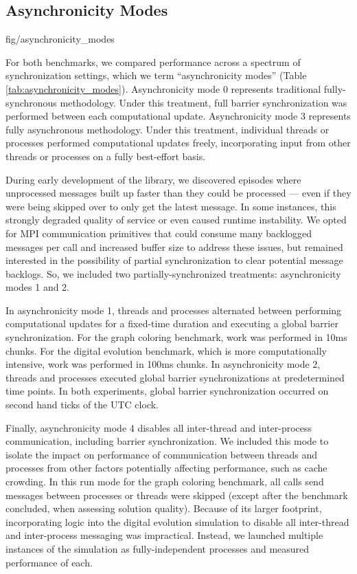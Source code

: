 \subsection{Asynchronicity Modes} \label{sec:asynchronicity_modes}

{fig/asynchronicity_modes}

For both benchmarks, we compared performance across a spectrum of synchronization settings, which we term ``asynchronicity modes'' (Table \ref{tab:asynchronicity_modes}).
Asynchronicity mode 0 represents traditional fully-synchronous methodology.
Under this treatment, full barrier synchronization was performed between each computational update.
Asynchronicity mode 3 represents fully asynchronous methodology.
Under this treatment, individual threads or processes performed computational updates freely, incorporating input from other threads or processes on a fully best-effort basis.

During early development of the library, we discovered episodes where unprocessed messages built up faster than they could be processed --- even if they were being skipped over to only get the latest message.
In some instances, this strongly degraded  quality of service or even caused runtime instability.
We opted for MPI communication primitives that could consume many backlogged messages per call and increased buffer size to address these issues, but remained interested in the possibility of partial synchronization to clear potential message backlogs.
So, we included two partially-synchronized treatments: asynchronicity modes 1 and 2.

In asynchronicity mode 1, threads and processes alternated between performing computational updates for a fixed-time duration and executing a global barrier synchronization.
For the graph coloring benchmark, work was performed in 10ms chunks.
For the digital evolution benchmark, which is more computationally intensive, work was performed in 100ms chunks.
In asynchronicity mode 2, threads and processes executed global barrier synchronizations at predetermined time points.
In both experiments, global barrier synchronization occurred on second hand ticks of the UTC clock.

Finally, asynchronicity mode 4 disables all inter-thread and inter-process communication, including barrier synchronization.
We included this mode to isolate the impact on performance of communication between threads and processes from other factors potentially affecting performance, such as cache crowding.
In this run mode for the graph coloring benchmark, all calls send messages between processes or threads were skipped (except after the benchmark concluded, when assessing solution quality).
Because of its larger footprint, incorporating logic into the digital evolution simulation to disable all inter-thread and inter-process messaging was impractical.
Instead, we launched multiple instances of the simulation as fully-independent processes and measured performance of each.
